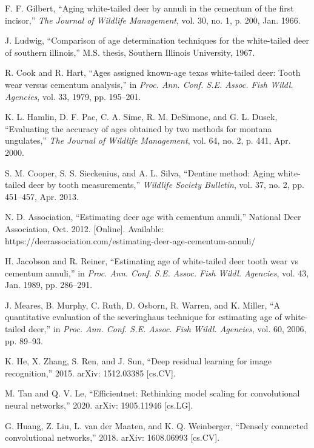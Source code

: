 \documentclass[11pt]{article}
\begin{document}
\begin{thebibliography}{99}
 F. F. Gilbert, ``Aging white-tailed deer by annuli in the cementum of the first incisor,'' \textit{The Journal of Wildlife Management}, vol. 30, no. 1, p. 200, Jan. 1966.

 J. Ludwig, ``Comparison of age determination techniques for the white-tailed deer of southern illinois,'' M.S. thesis, Southern Illinois University, 1967.

 R. Cook and R. Hart, ``Ages assigned known-age texas white-tailed deer: Tooth wear versus cementum analysis,'' in \textit{Proc. Ann. Conf. S.E. Assoc. Fish Wildl. Agencies}, vol. 33, 1979, pp. 195--201.

 K. L. Hamlin, D. F. Pac, C. A. Sime, R. M. DeSimone, and G. L. Dusek, ``Evaluating the accuracy of ages obtained by two methods for montana ungulates,'' \textit{The Journal of Wildlife Management}, vol. 64, no. 2, p. 441, Apr. 2000.

 S. M. Cooper, S. S. Sieckenius, and A. L. Silva, ``Dentine method: Aging white-tailed deer by tooth measurements,'' \textit{Wildlife Society Bulletin}, vol. 37, no. 2, pp. 451--457, Apr. 2013.

 N. D. Association, ``Estimating deer age with cementum annuli,'' National Deer Association, Oct. 2012. [Online]. Available: https://deerassociation.com/estimating-deer-age-cementum-annuli/

 H. Jacobson and R. Reiner, ``Estimating age of white-tailed deer tooth wear vs cementum annuli,'' in \textit{Proc. Ann. Conf. S.E. Assoc. Fish Wildl. Agencies}, vol. 43, Jan. 1989, pp. 286--291.

 J. Meares, B. Murphy, C. Ruth, D. Osborn, R. Warren, and K. Miller, ``A quantitative evaluation of the severinghaus technique for estimating age of white-tailed deer,'' in \textit{Proc. Ann. Conf. S.E. Assoc. Fish Wildl. Agencies}, vol. 60, 2006, pp. 89--93.

 K. He, X. Zhang, S. Ren, and J. Sun, ``Deep residual learning for image recognition,'' 2015. arXiv: 1512.03385 [cs.CV].

 M. Tan and Q. V. Le, ``Efficientnet: Rethinking model scaling for convolutional neural networks,'' 2020. arXiv: 1905.11946 [cs.LG].

 G. Huang, Z. Liu, L. van der Maaten, and K. Q. Weinberger, ``Densely connected convolutional networks,'' 2018. arXiv: 1608.06993 [cs.CV].

\end{thebibliography}
\end{document}
